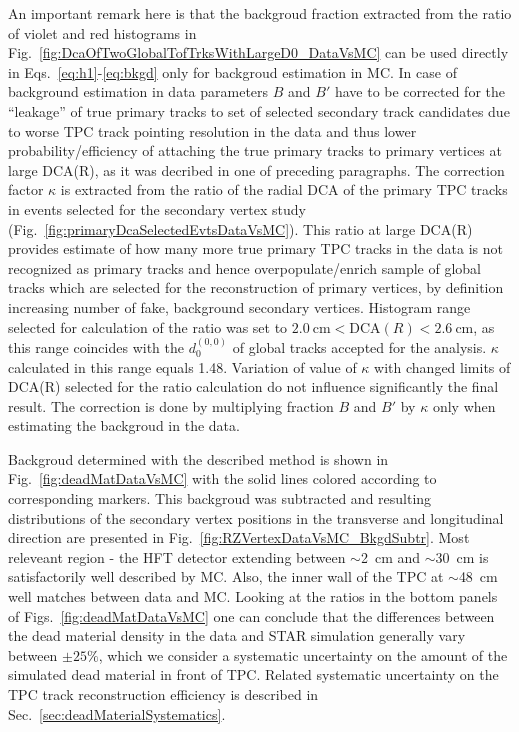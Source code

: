 An important remark here is that the backgroud fraction extracted from the ratio of violet and red histograms in Fig.~\ref{fig:DcaOfTwoGlobalTofTrksWithLargeD0_DataVsMC} can be used directly in Eqs.~\eqref{eq:h1}-\eqref{eq:bkgd} only for backgroud estimation in MC. In case of background estimation in data parameters $B$ and $B'$ have to be corrected for the ``leakage'' of true primary tracks to set of selected secondary track candidates due to worse TPC track pointing resolution in the data and thus lower probability/efficiency of attaching the true primary tracks to primary vertices at large DCA(R), as it was decribed in one of preceding paragraphs. The correction factor $\kappa$ is extracted from the ratio of the radial DCA of the primary TPC tracks in events selected for the secondary vertex study (Fig.~\ref{fig:primaryDcaSelectedEvtsDataVsMC}). This ratio at large DCA(R) provides estimate of how many more true primary TPC tracks in the data is not recognized as primary tracks and hence overpopulate/enrich sample of global tracks which are selected for the reconstruction of primary vertices, by definition increasing number of fake, background secondary vertices. Histogram range selected for calculation of the ratio was set to $2.0~\text{cm}<\text{DCA}(R)<2.6~\text{cm}$, as this range coincides with the $d_{0}^{(0,0)}$ of global tracks accepted for the analysis. $\kappa$ calculated in this range equals 1.48. Variation of value of $\kappa$ with changed limits of DCA(R) selected for the ratio calculation do not influence significantly the final result. The correction is done by multiplying fraction $B$ and $B'$ by $\kappa$ only when estimating the backgroud in the data.

Backgroud determined with the described method is shown in Fig.~\ref{fig:deadMatDataVsMC} with the solid lines colored according to corresponding markers. This backgroud was subtracted and resulting distributions of the secondary vertex positions in the transverse and longitudinal direction are presented in Fig.~\ref{fig:RZVertexDataVsMC_BkgdSubtr}. Most releveant region - the HFT detector extending between $\sim$2~cm and $\sim$30~cm is satisfactorily well described by MC. Also, the inner wall of the TPC at $\sim$48~cm well matches between data and MC. Looking at the ratios in the bottom panels of Figs.~\ref{fig:deadMatDataVsMC} one can conclude that the differences between the dead material density in the data and STAR simulation generally vary between $\pm25\%$, which we consider a systematic uncertainty on the amount of the simulated dead material in front of TPC. Related systematic uncertainty on the TPC track reconstruction efficiency is described in Sec.~\ref{sec:deadMaterialSystematics}.



